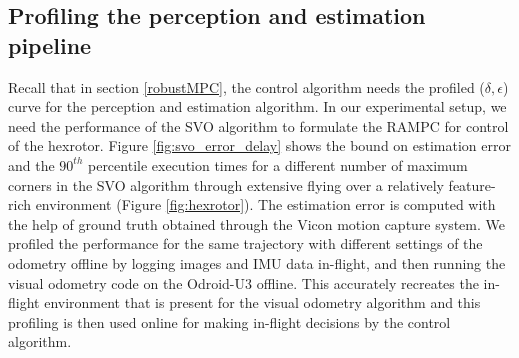 

\subsection{Profiling the perception and estimation pipeline}

Recall that in section \ref{robustMPC}, the control algorithm needs the profiled ($\delta,\epsilon$) curve for the perception and estimation algorithm. In our experimental setup, we need the performance of the SVO algorithm to formulate the RAMPC for control of the hexrotor. Figure \ref{fig:svo_error_delay} shows the bound on estimation error and the $90^{th}$ percentile execution times for a different number of maximum corners in the SVO algorithm through extensive flying over a relatively feature-rich environment (Figure \ref{fig:hexrotor}). The estimation error is computed with the help of ground truth obtained through the Vicon motion capture system. We profiled the performance for the same trajectory with different settings of the odometry offline by logging images and IMU data in-flight, and then running the visual odometry code on the Odroid-U3 offline.
This accurately recreates the in-flight environment that is present for the visual odometry algorithm and this profiling is then used online for making in-flight decisions by the control algorithm.

